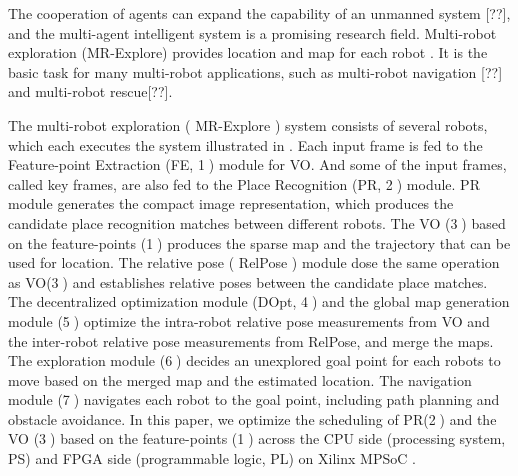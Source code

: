 \label{sec:intro}

The cooperation of agents can expand the capability of an unmanned system [??], and the multi-agent intelligent system is a promising research field.
Multi-robot exploration (MR-Explore) \cite{corah2019communication} provides location and map for each robot . It is the basic task for many multi-robot applications, such as multi-robot navigation [??] and multi-robot rescue[??].

The multi-robot exploration ( MR-Explore ) system \cite{corah2019communication, cieslewski2018data} consists of several robots, which each executes the system illustrated in . Each input frame is fed to the Feature-point Extraction (FE, \textcircled{1}) module for VO. 
And some of the input frames, called key frames, are also fed to the Place Recognition (PR, \textcircled{2}) module.
PR module generates the compact image representation, which produces the candidate place recognition matches between different robots. The VO (\textcircled{3}) based on the feature-points (\textcircled{1}) produces the sparse map and the trajectory that can be used for location. The relative pose ( RelPose ) module dose the same operation as VO(\textcircled{3}) and establishes relative poses between the candidate place matches. The decentralized optimization module (DOpt, \textcircled{4}) and the global map generation module (\textcircled{5}) optimize the  intra-robot relative pose measurements from VO and the inter-robot relative pose measurements from RelPose, and merge the maps. The exploration module (\textcircled{6}) decides an unexplored goal point for each robots to move based on the merged map and the estimated location. The navigation module (\textcircled{7}) navigates each robot to the goal point, including path planning and obstacle avoidance.
In this paper, we optimize the scheduling of PR(\textcircled{2}) and the VO (\textcircled{3}) based on the feature-points (\textcircled{1}) across the CPU side (processing system, PS) and FPGA side (programmable logic, PL) on Xilinx MPSoC \cite{MPSoC}.


